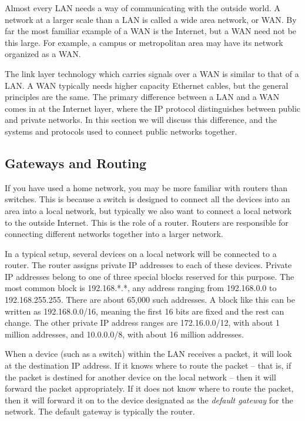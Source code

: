 Almost every LAN needs a way of communicating with the outside world. A network at a larger scale than a LAN is called a wide area network, or WAN. By far the most familiar example of a WAN is the Internet, but a WAN need not be this large. For example, a campus or metropolitan area may have its network organized as a WAN.

The link layer technology which carries signals over a WAN is similar to that of a LAN. A WAN typically needs higher capacity Ethernet cables, but the general principles are the same. The primary difference between a LAN and a WAN comes in at the Internet layer, where the IP protocol distinguishes between public and private networks. In this section we will discuss this difference, and the systems and protocols used to connect public networks together.

\subsection{Gateways and Routing}

If you have used a home network, you may be more familiar with routers than switches. This is because a switch is designed to connect all the devices into an area into a local network, but typically we also want to connect a local network to the outside Internet. This is the role of a router. Routers are responsible for connecting different networks together into a larger network.

In a typical setup, several devices on a local network will be connected to a router. The router assigns private IP addresses to each of these devices. Private IP addresses belong to one of three special blocks reserved for this purpose. The most common block is 192.168.*.*, any address ranging from 192.168.0.0 to 192.168.255.255. There are about 65,000 such addresses. A block like this can be written as 192.168.0.0/16, meaning the first 16 bits are fixed and the rest can change. The other private IP address ranges are 172.16.0.0/12, with about 1 million addresses, and 10.0.0.0/8, with about 16 million addresses.

When a device (such as a switch) within the LAN receives a packet, it will look at the destination IP address. If it knows where to route the packet -- that is, if the packet is destined for another device on the local network -- then it will forward the packet appropriately. If it does not know where to route the packet, then it will forward it on to the device designated as the \emph{default gateway} for the network. The default gateway is typically the router.

